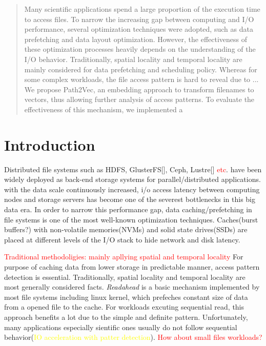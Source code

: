 \documentclass[conference]{IEEEtran}
\begin{document}
\begin{abstract}
    Many scientific applications spend a large proportion of the execution time to access files. 
    To narrow the increasing gap between computing and I/O performance, several optimization techniques were adopted, 
    such as data prefetching and data layout optimization. However, the effectiveness of these optimization processes heavily 
    depends on the understanding of the I/O behavior. Traditionally, spatial locality and temporal locality
    are mainly considered for data prefetching and scheduling policy. Whereas for some complex workloads, the file access pattern 
    is hard to reveal due to ... 
    We propose Path2Vec, an embedding approach to transform filenames to vectors, thus allowing further analysis of access patterns. 
    To evaluate the effectiveness of this mechanism, we implemented a 

\end{abstract}

\begin{IEEEkeywords}

\end{IEEEkeywords}

\section{Introduction}
Distributed file systems such as HDFS\cite{HDFS}, GlusterFS[], Ceph\cite{Ceph}, Lustre[] \textcolor{red}{etc}. have been widely deployed as back-end storage systems for parallel/distributed applications.
with the data scale continuously increased, i/o access latency between computing nodes and storage servers has become one of the severest bottlenecks in this big data era.
In order to narrow this performance gap, data caching/prefetching in file systems is one of the most well-known optimization techniques.
Caches(burst buffers?) with non-volatile memories(NVMs) and solid state drives(SSDs) are placed at different levels of the I/O stack to hide network and disk latency.

\textcolor{red}{Traditional methodoligies: mainly apllying spatial and temporal locality}
For purpose of caching data from lower storage in predictable manner, access pattern detection is essential.
Traditionally, spatial locality and temporal locality are most generally considered facts. 
\textit{Readahead} is a basic mechanism implemented by most file systems\cite{WhyDoes} including linux kernel, which prefeches constant size of data from a opened file to the cache. 
For workloads excuting sequential read, this approach benefits a lot due to the simple and definite pattern.
Unfortunately, many applications especially sientific ones usually do not follow sequential behavior(\textcolor{yellow}{IO acceleration with patter detection}). 
\textcolor{red}{How about small files workloads?}
\end{document}
